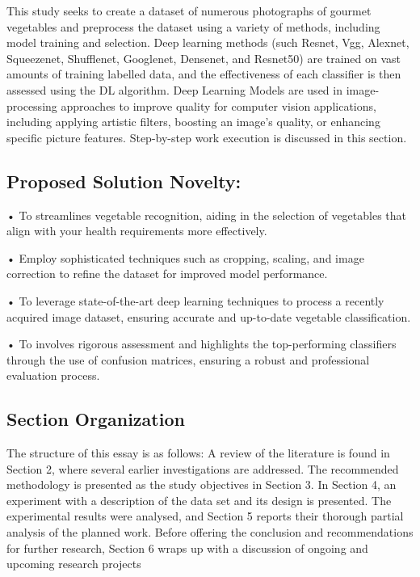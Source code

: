 \documentclass[a4paper,fleqn]{cas-sc}
\begin{document}
           This study seeks to create a dataset of numerous photographs of gourmet vegetables and preprocess the dataset using a variety of methods, including model training and selection. Deep learning methods (such Resnet, Vgg, Alexnet, Squeezenet, Shufflenet, Googlenet, Densenet, and Resnet50) are trained on vast amounts of training labelled data, and the effectiveness of each classifier is then assessed using the DL algorithm. Deep Learning Models are used in image-processing approaches to improve quality for computer vision applications, including applying artistic filters, boosting an image's quality, or enhancing specific picture features. Step-by-step work execution is discussed in this section.

\subsection{Proposed Solution Novelty:}
•	To streamlines vegetable recognition, aiding in the selection of vegetables that align with your health requirements more effectively.

•	Employ sophisticated techniques such as cropping, scaling, and image correction to refine the dataset for improved model performance.

•	To leverage state-of-the-art deep learning techniques to process a recently acquired image dataset, ensuring accurate and up-to-date vegetable classification.

•	To involves rigorous assessment and highlights the top-performing classifiers through the use of confusion matrices, ensuring a robust and professional evaluation process.

\subsection{Section Organization}
 The structure of this essay is as follows: A review of the literature is found in Section 2, where several earlier investigations are addressed. The recommended methodology is presented as the study objectives in Section 3. In Section 4, an experiment with a description of the data set and its design is presented. The experimental results were analysed, and Section 5 reports their thorough partial analysis of the planned work. Before offering the conclusion and recommendations for further research, Section 6 wraps up with a discussion of ongoing and upcoming research projects
\end{document}
